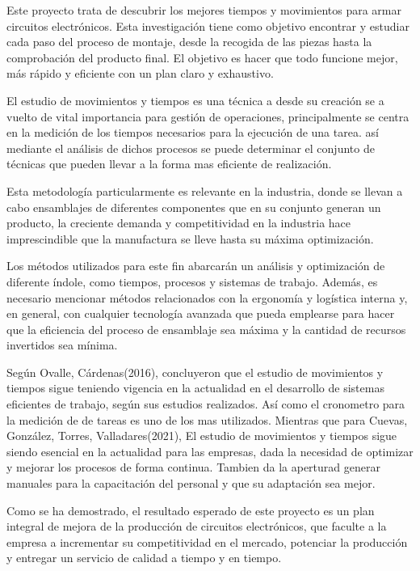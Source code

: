     Este proyecto trata de descubrir los mejores tiempos y movimientos para armar circuitos electrónicos. Esta investigación tiene como objetivo encontrar y estudiar cada paso del proceso de montaje, desde la recogida de las piezas hasta la comprobación del producto final. El objetivo es hacer que todo funcione mejor, más rápido y eficiente con un plan claro y exhaustivo.
    
    El estudio de movimientos y tiempos es una técnica a desde su creación se a vuelto de vital importancia para gestión de operaciones, principalmente se centra en la medición de los tiempos necesarios para la ejecución de una tarea. así mediante el análisis de dichos procesos se puede determinar el conjunto de técnicas que pueden llevar a la forma mas eficiente de realización.
    
    Esta metodología particularmente es relevante en la industria, donde se llevan a cabo ensamblajes de diferentes componentes que en su conjunto generan un producto, la creciente demanda y competitividad en la industria hace imprescindible que la manufactura se lleve hasta su máxima optimización.
    
    Los métodos utilizados para este fin abarcarán un análisis y optimización de diferente índole, como tiempos, procesos y sistemas de trabajo. Además, es necesario mencionar métodos relacionados con la ergonomía y logística interna y, en general, con cualquier tecnología avanzada que pueda emplearse para hacer que la eficiencia del proceso de ensamblaje sea máxima y la cantidad de recursos invertidos sea mínima.
    
    Según Ovalle, Cárdenas(2016), concluyeron que el estudio de movimientos y tiempos sigue teniendo vigencia en la actualidad en el desarrollo de sistemas eficientes de trabajo, según sus estudios realizados. Así como el cronometro para la medición de de tareas es uno de los mas utilizados.
    Mientras que para Cuevas, González, Torres, Valladares(2021), El estudio de movimientos y tiempos sigue siendo esencial en la actualidad para las empresas, dada la necesidad de optimizar y mejorar los procesos de forma continua. Tambien da la aperturad generar manuales para la capacitación del personal y que su adaptación sea mejor.\cite{REF2}
    
    Como se ha demostrado, el resultado esperado de este proyecto es un plan integral de mejora de la producción de circuitos electrónicos, que faculte a la empresa a incrementar su competitividad en el mercado, potenciar la producción y entregar un servicio de calidad a tiempo y en tiempo. 
    
